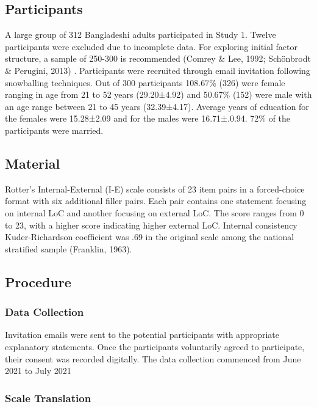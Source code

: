 \documentclass[
  english,
  man]{apa6}
\begin{document}
\hypertarget{participants}{%
\subsection{Participants}\label{participants}}

A large group of 312 Bangladeshi adults participated in Study 1. Twelve participants were excluded due to incomplete data. For exploring initial factor structure, a sample of 250-300 is recommended (Comrey \& Lee, 1992; Schönbrodt \& Perugini, 2013) . Participants were recruited through email invitation following snowballing techniques. Out of 300 participants 108.67\% (326) were female ranging in age from 21 to 52 years (29.20±4.92) and 50.67\% (152) were male with an age range between 21 to 45 years (32.39±4.17). Average years of education for the females were 15.28±2.09 and for the males were 16.71±.0.94. 72\% of the participants were married.

\hypertarget{material}{%
\subsection{Material}\label{material}}

Rotter's Internal-External (I-E) scale consists of 23 item pairs in a forced-choice format with six additional filler pairs. Each pair contains one statement focusing on internal LoC and another focusing on external LoC. The score ranges from 0 to 23, with a higher score indicating higher external LoC. Internal consistency Kuder-Richardson coefficient was .69 in the original scale among the national stratified sample (Franklin, 1963).

\hypertarget{procedure}{%
\subsection{Procedure}\label{procedure}}

\hypertarget{data-collection}{%
\subsubsection{Data Collection}\label{data-collection}}

Invitation emails were sent to the potential participants with appropriate explanatory statements. Once the participants voluntarily agreed to participate, their consent was recorded digitally. The data collection commenced from June 2021 to July 2021

\hypertarget{scale-translation}{%
\subsubsection{Scale Translation}\label{scale-translation}}
\end{document}
